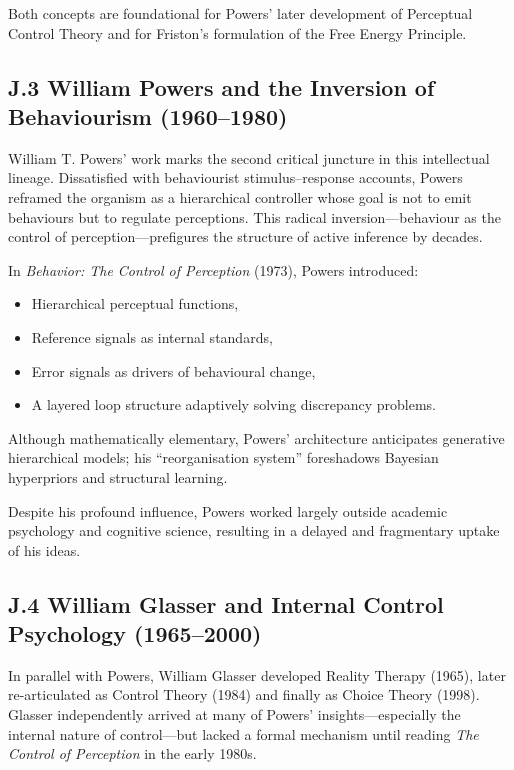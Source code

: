 \documentclass[11pt,a4paper,twoside]{article}
\begin{document}
Both concepts are foundational for Powers’ later development of Perceptual Control Theory and for Friston’s formulation of the Free Energy Principle.

\subsection*{J.3 William Powers and the Inversion of Behaviourism (1960--1980)}

William T. Powers’ work marks the second critical juncture in this intellectual lineage.
Dissatisfied with behaviourist stimulus--response accounts, Powers reframed the organism as a hierarchical controller whose goal is not to emit behaviours but to regulate perceptions.
This radical inversion---behaviour as the control of perception---prefigures the structure of active inference by decades.

In \emph{Behavior: The Control of Perception} (1973), Powers introduced:

\begin{itemize}
\item Hierarchical perceptual functions,
\item Reference signals as internal standards,
\item Error signals as drivers of behavioural change,
\item A layered loop structure adaptively solving discrepancy problems.
\end{itemize}

Although mathematically elementary, Powers’ architecture anticipates generative hierarchical models; his “reorganisation system” foreshadows Bayesian hyperpriors and structural learning.

Despite his profound influence, Powers worked largely outside academic psychology and cognitive science, resulting in a delayed and fragmentary uptake of his ideas.

\subsection*{J.4 William Glasser and Internal Control Psychology (1965--2000)}

In parallel with Powers, William Glasser developed Reality Therapy (1965), later re-articulated as Control Theory (1984) and finally as Choice Theory (1998).
Glasser independently arrived at many of Powers’ insights---especially the internal nature of control---but lacked a formal mechanism until reading \emph{The Control of Perception} in the early 1980s.
\end{document}
